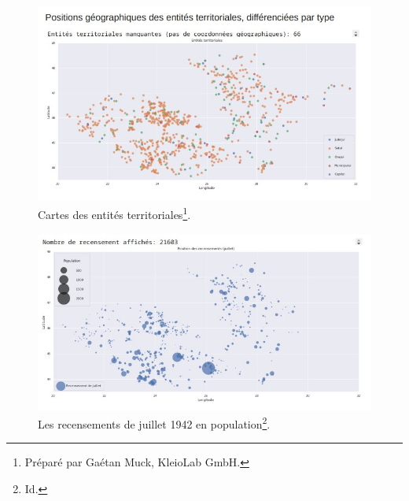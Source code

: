 \documentclass[a4paper,12pt,twoside]{book}
\begin{document}
                    \begin{figure}[!ht]
            			\centering
                        \includegraphics[width=\textwidth]{images/entites_terr_map.jpg}
                        \vspace{-1cm}
                        \caption[Carte des entités territoriales.]{Cartes des entités territoriales\footnote{Préparé par Gaétan Muck, KleioLab GmbH.}.}
                        \label{fig19}
                    \end{figure}
                    
                    \begin{figure}[!ht]
            			\centering
                        \includegraphics[width=15cm]{images/recensement_map.jpg}
                        \vspace{-1cm}
                        \caption[Les recensements en population.]{Les recensements de juillet 1942 en population\footnote{Id.}.}
                        \label{fig20}
                    \end{figure}
				    \pagebreak
				    
\end{document}
